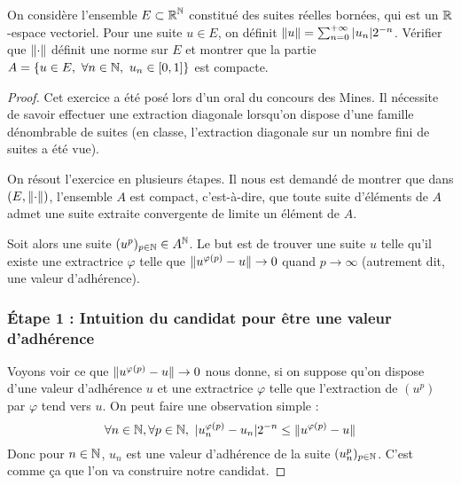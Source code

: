 \documentclass[10pt]{scrartcl}
\title{}
\author{}
\date{}
\begin{document}
    \begin{exo}
        On considère l'ensemble $E\subset \operatorname{\mathbb R}^{\operatorname{\mathbb N}}$ constitué des suites réelles bornées, qui est un $\operatorname{\mathbb R}$-espace vectoriel.
        Pour une suite $u\in E$, on définit $\lVert u\rVert=\sum_{n=0}^{+\infty}|u_n|2^{-n}$. Vérifier que $\lVert \cdot\rVert$ définit une norme sur $E$ 
        et montrer que la partie $A=\lbrace u\in E,\ \forall n\in\N,\ u_n\in[0,1]\rbrace$ est compacte.
    \end{exo}

    \begin{proof}
        Cet exercice a été posé lors d'un oral du concours des Mines. 
        Il nécessite de savoir effectuer une extraction diagonale lorsqu'on dispose d'une famille dénombrable de suites (en classe, l'extraction diagonale sur un nombre fini de suites a été vue).

        On résout l'exercice en plusieurs étapes. 
        Il nous est demandé de montrer que dans $(E,\lVert \cdot\rVert)$, l'ensemble $A$ est compact, c'est-à-dire, que toute suite d'éléments de $A$ admet une suite extraite convergente de limite un élément de $A$. 

        Soit alors une suite $(u^p)_{p\in\operatorname{\mathbb N}}\in A^{\operatorname{\mathbb N}}$. 
        Le but est de trouver une suite $u$ telle qu'il existe une extractrice $\varphi$ telle que $\lVert u^{\varphi(p)}-u\rVert\to 0$ quand $p\to\infty$ (autrement dit, une valeur d'adhérence).
        \subsubsection*{Étape 1 : Intuition du candidat pour être une valeur d'adhérence} Voyons voir ce que $\lVert u^{\varphi(p)}-u\rVert\to 0$ nous donne, si on suppose qu'on dispose d'une valeur d'adhérence $u$ et une extractrice $\varphi$ telle que l'extraction de $(u^p)$ par $\varphi$ tend vers $u$. 
        On peut faire une observation simple : 
        \[
            \forall n\in\N,\forall p\in\N,\ |u^{\varphi(p)}_n-u_n|2^{-n}\leq\norm{u^{\varphi(p)}-u}
        \]
        Donc pour $n\in\operatorname{\mathbb N}$, $u_n$ est une valeur d'adhérence de la suite $(u_n^p)_{p\in\operatorname{\mathbb N}}$. C'est comme ça que l'on va construire notre candidat. 


\end{proof}
\end{document}
